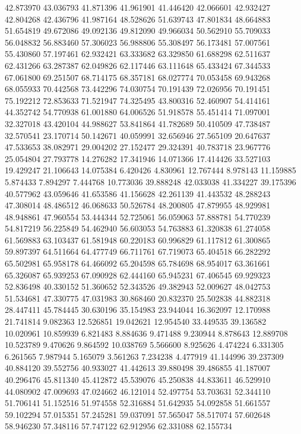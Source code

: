 42.873970
43.036793
41.871396
41.961901
41.446420
42.066601
42.932427
42.804268
42.436796
41.987164
48.528626
51.639743
47.801834
48.664883
51.654819
49.672086
49.092136
49.812090
49.966034
50.562910
55.709033
56.048832
56.883460
57.306023
56.988806
55.308497
56.173481
57.007561
55.430860
57.197461
62.932421
63.333682
63.329850
61.688298
62.511637
62.431266
63.287387
62.049826
62.117446
63.111648
65.433424
67.344533
67.061800
69.251507
68.714175
68.357181
68.027774
70.053458
69.943268
68.055933
70.442568
73.442296
74.030754
70.191439
72.026956
70.191451
75.192212
72.853633
71.521947
74.325495
43.800316
52.460907
54.414161
44.352742
54.770938
61.001880
64.006526
51.918578
55.451414
71.097001
32.327018
43.420104
44.988627
53.841864
41.782689
50.410509
47.738487
32.570541
23.170714
50.142671
40.059991
32.656946
27.565109
20.647637
47.533653
38.082971
29.004202
27.152477
29.324391
40.783718
23.967776
25.054804
27.793778
14.276282
17.341946
14.071366
17.414426
33.527103
19.429247
21.106643
14.075384
6.420426
4.830961
12.767444
8.978143
11.159885
5.874433
7.894297
7.444768
10.773036
39.888248
42.033038
41.334227
39.175396
40.577962
43.059646
41.653586
41.156628
42.261139
41.443532
48.288243
47.308014
48.486512
46.068633
50.526784
48.200805
47.879955
48.929981
48.948861
47.960554
53.444344
52.725061
56.059063
57.888781
54.770239
54.817219
56.225849
54.462940
56.603053
54.763883
61.320838
61.274058
61.569883
63.103437
61.581948
60.220183
60.996829
61.117812
61.300865
59.897397
64.511664
64.477749
66.711761
67.719073
65.404518
66.282292
65.502981
65.958178
64.466092
65.204598
65.784698
68.954017
63.361661
65.326087
65.939253
67.090928
62.444160
65.945231
67.406545
69.929323
52.836498
40.330152
51.360652
52.343526
49.382943
52.009627
48.042753
51.534681
47.330775
47.031983
30.868460
20.832370
25.502838
44.882318
28.447411
45.784445
30.630196
35.154983
23.944044
16.362097
12.170988
21.741814
9.082363
12.526851
19.042621
12.954540
33.449535
39.136582
10.020961
10.859939
6.821483
8.884636
9.471488
9.230944
8.878643
12.889708
10.523789
9.470626
9.864592
10.038769
5.566600
8.925626
4.474224
6.331305
6.261565
7.987944
5.165079
3.561263
7.234238
4.477919
41.144996
39.237309
40.884120
39.552756
40.933027
41.442613
39.880498
39.486855
41.187007
40.296476
45.811340
45.412872
45.539076
45.250838
44.833611
46.529910
44.080902
47.009693
47.024662
46.121014
52.497754
53.703631
52.344110
51.706141
51.152516
51.974558
52.316884
51.642935
54.092858
51.661557
59.102294
57.015351
57.245281
59.037091
57.565047
58.517074
57.602648
58.946230
57.348116
57.747122
62.912956
62.331088
62.155734
